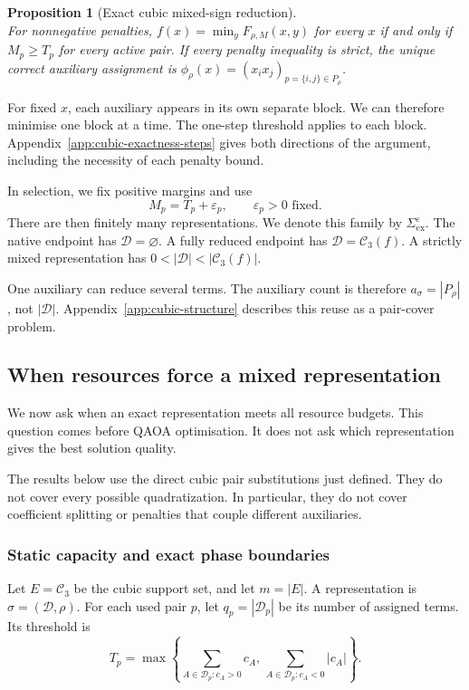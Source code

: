 \documentclass[a4paper,onecolumn,11pt,unpublished]{quantumarticle}
\newtheorem{proposition}[proposition]{Proposition}
\theoremstyle{remark}
\begin{document}
\begin{proposition}[Exact cubic mixed-sign reduction]
\label{prop:cubic-mixed-sign}
\leavevmode\\
For nonnegative penalties, $f(x)=\min_yF_{\rho,M}(x,y)$ for every $x$
if and only if $M_p\geq T_p$ for every active pair. If every penalty inequality is strict, the unique correct auxiliary
assignment is $\phi_\rho(x)=(x_ix_j)_{p=\{i,j\}\in P_\rho}$.
\end{proposition}

For fixed $x$, each auxiliary appears in its own separate block.
We can therefore minimise one block at a time. The one-step threshold
applies to each block. Appendix~\ref{app:cubic-exactness-steps} gives both
directions of the argument, including the necessity of each penalty bound.

In selection, we fix positive margins and use
\begin{equation}
M_p=T_p+\varepsilon_p,\qquad \varepsilon_p>0\text{ fixed}.
\label{eq:canonical-cubic-penalty}
\end{equation}
There are then finitely many representations. We denote this family by
$\Sigma_{\mathrm{ex}}^\varepsilon$.
The native endpoint has $\mathcal D=\varnothing$.
A fully reduced endpoint has $\mathcal D=\mathcal C_3(f)$.
A strictly mixed representation has $0<|\mathcal D|<|\mathcal C_3(f)|$.

One auxiliary can reduce several terms. The auxiliary count is therefore
$a_\sigma=|P_\rho|$, not $|\mathcal D|$.
Appendix~\ref{app:cubic-structure} describes this reuse as a pair-cover
problem.

\subsection{When resources force a mixed representation}
\label{sec:representation-phases}

We now ask when an exact representation meets all resource budgets.
This question comes before QAOA optimisation. It does not ask which
representation gives the best solution quality.

The results below use the direct cubic pair substitutions just defined.
They do not cover every possible quadratization. In particular, they do
not cover coefficient splitting or penalties that couple different
auxiliaries.

\subsubsection{Static capacity and exact phase boundaries}
Let $E=\mathcal C_3$ be the cubic support set, and let $m=|E|$.
A representation is $\sigma=(\mathcal D,\rho)$.
For each used pair $p$, let $q_p=|\mathcal D_p|$ be its number of assigned
terms. Its threshold is
\[
T_p=\max\!\left\{
\sum_{A\in\mathcal D_p:c_A>0}c_A,\,
\sum_{A\in\mathcal D_p:c_A<0}|c_A|
\right\}.
\]
\end{document}
